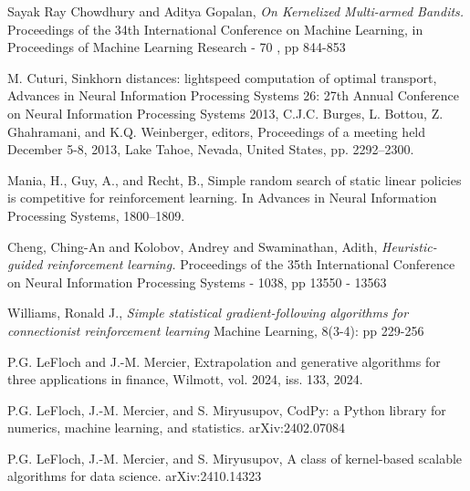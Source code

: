 \documentclass[
]{article}
\numberwithin{equation}{section}
\begin{document}
\newpage

\begin{thebibliography}{1}

{\sc Sayak Ray Chowdhury and Aditya Gopalan}, 
{\sl On Kernelized Multi-armed Bandits.}
Proceedings of the 34th International Conference on Machine Learning, in Proceedings of Machine Learning Research - 70 , pp 844-853 

{\sc M. Cuturi,} 
Sinkhorn distances: lightspeed computation of optimal transport, 
 Advances in Neural Information
Processing Systems 26: 27th Annual Conference on Neural Information Processing Systems 2013, C.J.C. Burges, L. Bottou, Z. Ghahramani, and K.Q. Weinberger, editors, 
Proceedings of a meeting held December 5-8, 2013, Lake Tahoe, Nevada, United States, pp. 2292--2300.


{\sc Mania, H., Guy, A., and Recht, B.}, 
Simple random search of
static linear policies is competitive for reinforcement learning. In Advances in Neural Information Processing Systems, 1800–1809.


{\sc Cheng, Ching-An and Kolobov, Andrey and Swaminathan, Adith}, 
{\sl Heuristic-guided reinforcement learning.}
Proceedings of the 35th International Conference on Neural Information Processing Systems - 1038, pp 13550 - 13563



{\sc Williams, Ronald J.}, 
{\sl Simple statistical gradient-following algorithms for connectionist reinforcement learning}
Machine Learning, 8(3-4): pp 229-256


{\sc P.G. LeFloch and J.-M. Mercier,} 
Extrapolation and generative algorithms for three applications in finance,
Wilmott, vol. 2024, iss. 133, 2024.

{\sc P.G. LeFloch, J.-M. Mercier, and S. Miryusupov,}
CodPy: a Python library for numerics, machine learning, and statistics.
arXiv:2402.07084


{\sc P.G. LeFloch, J.-M. Mercier, and S. Miryusupov,}
A class of kernel-based scalable algorithms for data science. arXiv:2410.14323


\end{thebibliography}
\end{document}
